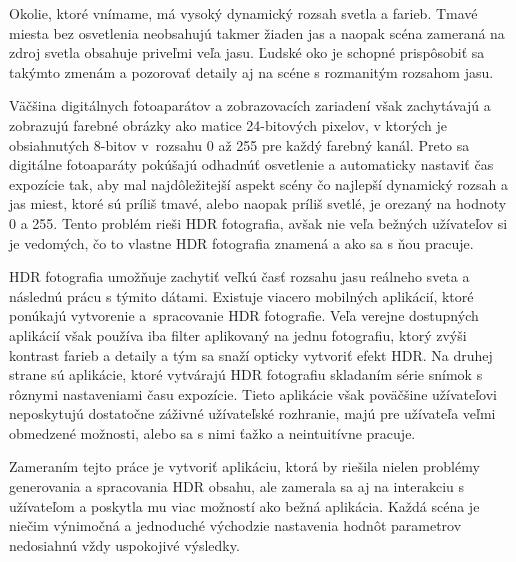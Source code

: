 Okolie, ktoré vnímame, má vysoký dynamický rozsah svetla a farieb. Tmavé miesta bez osvetlenia neobsahujú takmer žiaden jas a naopak
scéna zameraná na zdroj svetla obsahuje priveľmi veľa jasu. Ľudské oko je schopné prispôsobiť sa takýmto zmenám a pozorovať detaily
aj na scéne s rozmanitým rozsahom jasu.

Väčšina digitálnych fotoaparátov a zobrazovacích zariadení však zachytávajú a zobrazujú farebné obrázky ako matice 24-bitových pixelov,
v ktorých je obsiahnutých 8-bitov v~rozsahu 0 až 255 pre každý farebný kanál. Preto sa digitálne fotoaparáty pokúšajú odhadnúť osvetlenie
a automaticky nastaviť čas expozície tak, aby mal najdôležitejší aspekt scény čo najlepší dynamický rozsah a jas miest, ktoré sú príliš
tmavé, alebo naopak príliš svetlé, je orezaný na hodnoty 0 a 255. Tento problém rieši HDR fotografia, avšak nie veľa bežných užívateľov si
je vedomých, čo to vlastne HDR fotografia znamená a ako sa s ňou pracuje.

HDR fotografia umožňuje zachytiť veľkú časť rozsahu jasu reálneho sveta a následnú prácu s týmito dátami. Existuje viacero mobilných aplikácií,
ktoré ponúkajú vytvorenie a~spracovanie HDR fotografie. Veľa verejne dostupných aplikácií však používa iba filter aplikovaný na jednu
fotografiu, ktorý zvýši kontrast farieb a detaily a tým sa snaží opticky vytvoriť efekt HDR. Na druhej strane sú aplikácie, ktoré
vytvárajú HDR fotografiu skladaním série snímok s rôznymi nastaveniami času expozície. Tieto aplikácie však poväčšine užívateľovi neposkytujú
dostatočne záživné užívateľské rozhranie, majú pre užívateľa veľmi obmedzené možnosti, alebo sa s nimi ťažko a neintuitívne pracuje.

Zameraním tejto práce je vytvoriť aplikáciu, ktorá by riešila nielen problémy generovania a spracovania HDR obsahu, ale zamerala sa aj na
interakciu s užívateľom a poskytla mu viac možností ako bežná aplikácia. Každá scéna je niečim výnimočná a jednoduché východzie nastavenia
hodnôt parametrov nedosiahnú vždy uspokojivé výsledky.
